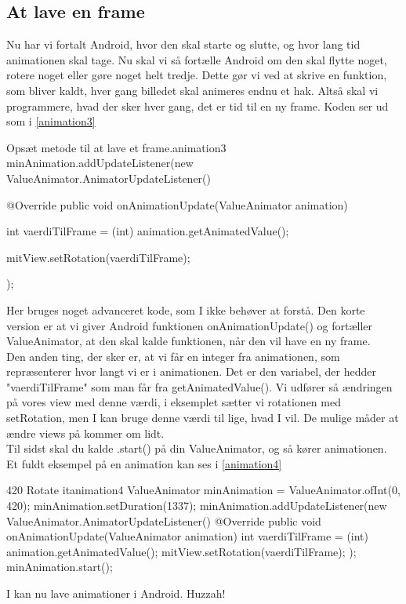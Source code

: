 \subsection{At lave en frame}
Nu har vi fortalt Android, hvor den skal starte og slutte, og hvor lang tid animationen skal tage. Nu skal vi så fortælle Android om den skal flytte noget, rotere noget eller gøre noget helt tredje. Dette gør vi ved at skrive en funktion, som bliver kaldt, hver gang billedet skal animeres endnu et hak. Altså skal vi programmere, hvad der sker hver gang, det er tid til en ny frame. Koden ser ud som i \autoref{animation3}
\begin{JavaCode}{Opsæt metode til at lave et frame.}{animation3}
	minAnimation.addUpdateListener(new ValueAnimator.AnimatorUpdateListener() {
		@Override
		public void onAnimationUpdate(ValueAnimator animation) {
			int vaerdiTilFrame = (int) animation.getAnimatedValue();
			
			mitView.setRotation(vaerdiTilFrame);
		}
	});
\end{JavaCode}
Her bruges noget advanceret kode, som I ikke behøver at forstå. Den korte version er at vi giver Android funktionen onAnimationUpdate() og fortæller ValueAnimator, at den skal kalde funktionen, når den vil have en ny frame.\\
Den anden ting, der sker er, at vi får en integer fra animationen, som repræsenterer hvor langt vi er i animationen. Det er den variabel, der hedder "vaerdiTilFrame" som man får fra getAnimatedValue(). Vi udfører så ændringen på vores view med denne værdi, i eksemplet sætter vi rotationen med setRotation, men I kan bruge denne værdi til lige, hvad I vil. De mulige måder at ændre views på kommer om lidt.\\
Til sidst skal du kalde .start() på din ValueAnimator, og så kører animationen. Et fuldt eksempel på en animation kan ses i \autoref{animation4}
\begin{JavaCode}{420 Rotate it}{animation4}
	ValueAnimator minAnimation = ValueAnimator.ofInt(0, 420);
	minAnimation.setDuration(1337);
	minAnimation.addUpdateListener(new ValueAnimator.AnimatorUpdateListener() {
		@Override
		public void onAnimationUpdate(ValueAnimator animation) {
			int vaerdiTilFrame = (int) animation.getAnimatedValue();
			mitView.setRotation(vaerdiTilFrame);
		}
	});
	minAnimation.start();
\end{JavaCode}
I kan nu lave animationer i Android. Huzzah!

